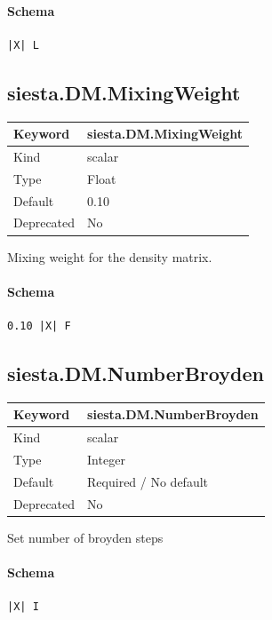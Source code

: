 \documentclass[11pt]{article}
\begin{document}
{{{{{\paragraph{Schema}
\begin{Verbatim}
|X| L
\end{Verbatim}

\subsection{siesta.DM.MixingWeight}
\label{kw:siesta-DM-MixingWeight}
\begin{longtable}{|p{1.5in}|p{4.5in}|}
\hline
Keyword & siesta.DM.MixingWeight \\
\hline
Kind & scalar \\
\hline
Type & Float \\
\hline
Default & 0.10 \\
\hline
Deprecated & No \\
\hline
\end{longtable}
 Mixing weight for the density matrix.

\paragraph{Schema}
\begin{Verbatim}
0.10 |X| F
\end{Verbatim}

\subsection{siesta.DM.NumberBroyden}
\label{kw:siesta-DM-NumberBroyden}
\begin{longtable}{|p{1.5in}|p{4.5in}|}
\hline
Keyword & siesta.DM.NumberBroyden \\
\hline
Kind & scalar \\
\hline
Type & Integer \\
\hline
Default & Required / No default \\
\hline
Deprecated & No \\
\hline
\end{longtable}
 Set number of broyden steps

\paragraph{Schema}
\begin{Verbatim}
|X| I
\end{Verbatim}

}}}}}
\end{document}
